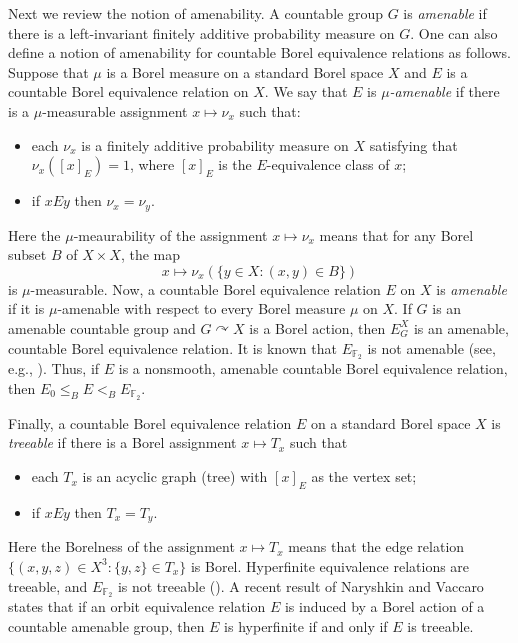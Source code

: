 \documentclass{amsart}
\theoremstyle{definition}
\theoremstyle{problem}
\theoremstyle{remark}
\numberwithin{equation}{section}
\begin{document}
Next we review the notion of amenability. A countable group $G$ is {\em amenable} if there is a left-invariant finitely additive probability measure on $G$.  One can also define a notion of amenability for countable Borel equivalence relations as follows. Suppose that $\mu$ is a Borel measure on a standard Borel space $X$ and $E$ is a countable Borel equivalence relation on $X$. We say that $E$
 is {\em $\mu$-amenable} if there is a $\mu$-measurable assignment $x\mapsto \nu_x$ such that:
\begin{itemize}
\item each $\nu_x$ is a finitely additive probability measure on $X$ satisfying that $\nu_x([x]_E)=1$, where $[x]_E$ is the $E$-equivalence class of $x$;
\item if $xEy$ then $\nu_x=\nu_y$. 
\end{itemize}
Here the $\mu$-meaurability of the assignment $x\mapsto \nu_x$ means that for any Borel subset $B$ of $X\times X$, the map
$$ x\mapsto \nu_x(\{ y\in X\colon (x,y)\in B\}) $$
is $\mu$-measurable. Now, a countable Borel equivalence relation $E$ on $X$ is {\em amenable} if it is $\mu$-amenable with respect to every
 Borel measure $\mu$ on $X$. If $G$ is an amenable countable group and $G\curvearrowright X$ is a Borel action, then $E^X_G$ is an amenable, countable Borel equivalence relation. It is known that $E_{\mathbb{F}_2}$ is not amenable (see, e.g., \cite[Proposition 7.4.4 and Theorem 7.4.8]{GaoBook}). Thus, if $E$ is a nonsmooth, amenable countable Borel equivalence relation, then $E_0\leq_B E<_B E_{\mathbb{F}_2}$. 
 
 Finally, a countable Borel equivalence relation $E$ on a standard Borel space $X$ is {\em treeable} if there is a Borel assignment $x\mapsto T_x$ such that 
 \begin{itemize}
 \item each $T_x$ is an acyclic graph (tree) with $[x]_E$ as the vertex set;
 \item if $xEy$ then $T_x=T_y$.
 \end{itemize}
 Here the Borelness of the assignment $x\mapsto T_x$ means that the edge relation $\{(x,y,z)\in X^3\colon \{y,z\}\in T_x\}$ is Borel. Hyperfinite equivalence relations are treeable, and $E_{\mathbb{F}_2}$ is not treeable (\cite[Corollary 3.28]{JKL}). A recent result of Naryshkin and Vaccaro \cite{NV} states that if an orbit equivalence relation $E$ is induced by a Borel action of a countable amenable group, then $E$ is hyperfinite if and only if $E$ is treeable. 
\end{document}
